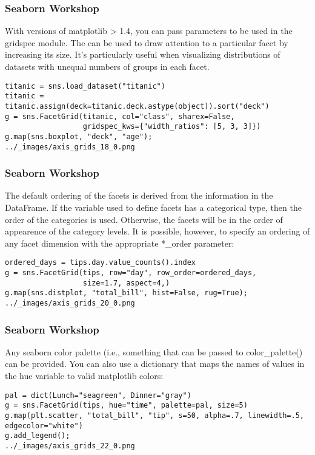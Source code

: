 \begin{frame}[fragile]
\frametitle{Seaborn Workshop}
\large
With versions of matplotlib > 1.4, you can pass parameters to be used in the gridspec module. The can be used to draw attention to a particular facet by increasing its size. It’s particularly useful when visualizing distributions of datasets with unequal numbers of groups in each facet.
\begin{verbatim}
titanic = sns.load_dataset("titanic")
titanic = titanic.assign(deck=titanic.deck.astype(object)).sort("deck")
g = sns.FacetGrid(titanic, col="class", sharex=False,
                  gridspec_kws={"width_ratios": [5, 3, 3]})
g.map(sns.boxplot, "deck", "age");
../_images/axis_grids_18_0.png
\end{verbatim}
\end{frame}
\begin{frame}[fragile]
\frametitle{Seaborn Workshop}
\large
The default ordering of the facets is derived from the information in the DataFrame. If the variable used to define facets has a categorical type, then the order of the categories is used. Otherwise, the facets will be in the order of appearence of the category levels. It is possible, however, to specify an ordering of any facet dimension with the appropriate *_order parameter:

\begin{verbatim}
ordered_days = tips.day.value_counts().index
g = sns.FacetGrid(tips, row="day", row_order=ordered_days,
                  size=1.7, aspect=4,)
g.map(sns.distplot, "total_bill", hist=False, rug=True);
../_images/axis_grids_20_0.png
\end{verbatim}
\end{frame}
\begin{frame}[fragile]
\frametitle{Seaborn Workshop}
\large
Any seaborn color palette (i.e., something that can be passed to color\_palette() can be provided. You can also use a dictionary that maps the names of values in the hue variable to valid matplotlib colors:
\begin{verbatim}
pal = dict(Lunch="seagreen", Dinner="gray")
g = sns.FacetGrid(tips, hue="time", palette=pal, size=5)
g.map(plt.scatter, "total_bill", "tip", s=50, alpha=.7, linewidth=.5, edgecolor="white")
g.add_legend();
../_images/axis_grids_22_0.png
\end{verbatim}
\end{frame}
